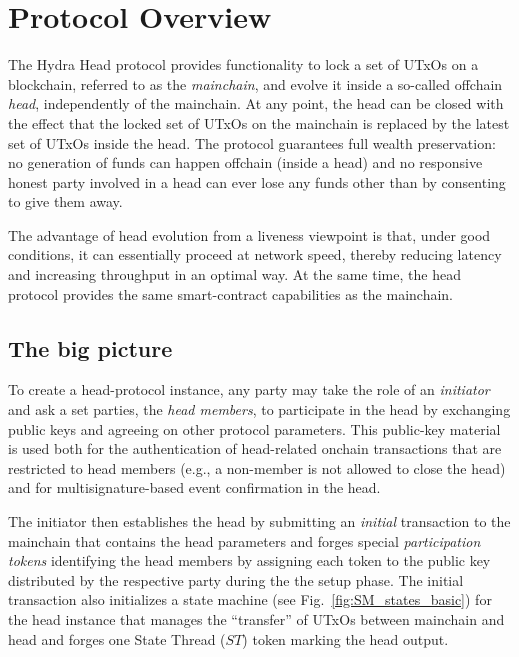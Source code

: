 \section{Protocol Overview}\label{sec:overview}


The Hydra Head protocol provides functionality to lock a set of UTxOs on a
blockchain, referred to as the \emph{mainchain}, and evolve it inside a
so-called offchain \emph{head}, independently of the mainchain. At any point,
the head can be closed with the effect that the locked set of UTxOs on the
mainchain is replaced by the latest set of UTxOs inside the head. The protocol
guarantees full wealth preservation: no generation of funds can happen offchain
(inside a head) and no responsive honest party involved in a head can ever lose
any funds other than by consenting to give them away.

The advantage of head evolution from a liveness viewpoint is that, under good
conditions, it can essentially proceed at network speed, thereby reducing
latency and increasing throughput in an optimal way. At the same time, the head
protocol provides the same smart-contract capabilities as the mainchain.

\subsection{The big picture}\label{sec:overview_bp}

To create a head-protocol instance, any party may take the role of an
\emph{initiator} and ask a set parties, the \emph{head members}, to
participate in the head by exchanging public keys and agreeing on other protocol parameters. 
This public-key material is used both
for the authentication of head-related onchain transactions that
are restricted to head members (e.g., a non-member is not allowed
to close the head) and for multisignature-based event confirmation
in the head.

The initiator then establishes the head by submitting an
\emph{initial} transaction to the mainchain that contains the
head parameters and forges special \emph{participation tokens}
identifying the head members by assigning each token to the public key
distributed by the respective party during the the setup phase.
The initial transaction also initializes a state machine
(see Fig.~\ref{fig:SM_states_basic}) for the head instance that manages
the ``transfer'' of UTxOs between mainchain and head and forges one State Thread ($ST$) token marking the head output.

